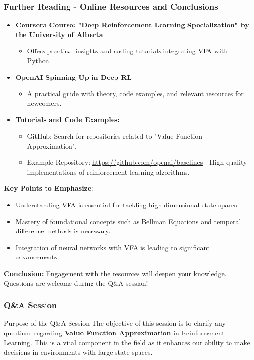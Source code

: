 \documentclass[aspectratio=169]{beamer}
\begin{document}
\begin{frame}[fragile]
  \frametitle{Further Reading - Online Resources and Conclusions}
  \begin{itemize}
    \item \textbf{Coursera Course: "Deep Reinforcement Learning Specialization" by the University of Alberta}
      \begin{itemize}
        \item Offers practical insights and coding tutorials integrating VFA with Python.
      \end{itemize}
      
    \item \textbf{OpenAI Spinning Up in Deep RL}
      \begin{itemize}
        \item A practical guide with theory, code examples, and relevant resources for newcomers.
      \end{itemize}
      
    \item \textbf{Tutorials and Code Examples:}
      \begin{itemize}
        \item GitHub: Search for repositories related to "Value Function Approximation".
        \item Example Repository: \url{https://github.com/openai/baselines} - High-quality implementations of reinforcement learning algorithms.
      \end{itemize}
  \end{itemize}

  \textbf{Key Points to Emphasize:}
  \begin{itemize}
    \item Understanding VFA is essential for tackling high-dimensional state spaces.
    \item Mastery of foundational concepts such as Bellman Equations and temporal difference methods is necessary.
    \item Integration of neural networks with VFA is leading to significant advancements.
  \end{itemize}
  
  \textbf{Conclusion:} Engagement with the resources will deepen your knowledge. Questions are welcome during the Q\&A session!
\end{frame}

\begin{frame}[fragile]
    \frametitle{Q\&A Session}
    \begin{block}{Purpose of the Q\&A Session}
        The objective of this session is to clarify any questions regarding 
        \textbf{Value Function Approximation} in Reinforcement Learning. This is a vital 
        component in the field as it enhances our ability to make decisions in environments 
        with large state spaces.
    \end{block}
\end{frame}
\end{document}
